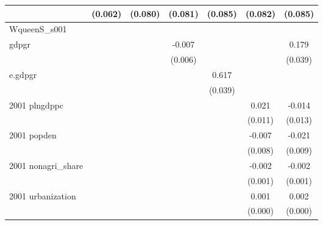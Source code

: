 \begin{table}[htbp]
\begin{tabular}{l*{6}{c}}
                    &     (0.062)         &     (0.080)         &     (0.081)         &     (0.085)         &     (0.082)         &     (0.085)         \\
\hline
WqueenS\_s001        &                     &                     &                     &                     &                     &                     \\
gdpgr               &                     &                     &      -0.007         &                     &                     &       0.179\sym{***}\\
                    &                     &                     &     (0.006)         &                     &                     &     (0.039)         \\
e.gdpgr             &                     &                     &                     &       0.617\sym{***}&                     &                     \\
                    &                     &                     &                     &     (0.039)         &                     &                     \\
2001 plngdppc       &                     &                     &                     &                     &       0.021\sym{*}  &      -0.014         \\
                    &                     &                     &                     &                     &     (0.011)         &     (0.013)         \\
2001 popden         &                     &                     &                     &                     &      -0.007         &      -0.021\sym{**} \\
                    &                     &                     &                     &                     &     (0.008)         &     (0.009)         \\
2001 nonagri\_share  &                     &                     &                     &                     &      -0.002\sym{**} &      -0.002\sym{**} \\
                    &                     &                     &                     &                     &     (0.001)         &     (0.001)         \\
2001 urbanization   &                     &                     &                     &                     &       0.001\sym{***}&       0.002\sym{***}\\
                    &                     &                     &                     &                     &     (0.000)         &     (0.000)         \\

\end{tabular}
\end{table}
